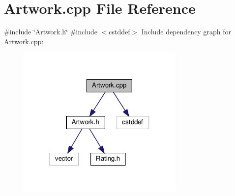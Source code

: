 \section{Artwork.\+cpp File Reference}
\label{_artwork_8cpp}
{\ttfamily \#include \char`\"{}Artwork.\+h\char`\"{}}\newline
{\ttfamily \#include $<$cstddef$>$}\newline
Include dependency graph for Artwork.\+cpp\+:\nopagebreak
\begin{figure}[H]
\begin{center}
\leavevmode
\includegraphics[width=232pt]{_artwork_8cpp__incl}
\end{center}
\end{figure}
